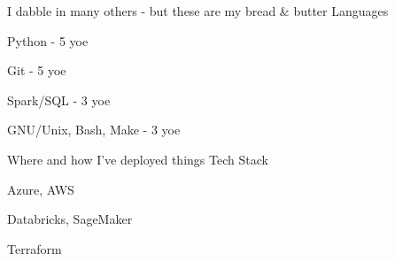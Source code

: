 
\begin{cventries}
  \cventry
    {I dabble in many others - but these are my bread \& butter}
    {Languages}
    {}
    {}
    {
      \begin{cvitems}
        \item {Python - 5 yoe}
        \item {Git - 5 yoe}
        \item {Spark/SQL - 3 yoe}
        \item {GNU/Unix, Bash, Make - 3 yoe}
      \end{cvitems}
    }

  \cventry
    {Where and how I've deployed things}
    {Tech Stack}
    {}
    {}
    {
      \begin{cvitems}
        \item {Azure, AWS}
        \item {Databricks, SageMaker}
        \item {Terraform}
      \end{cvitems}
    }

\end{cventries}